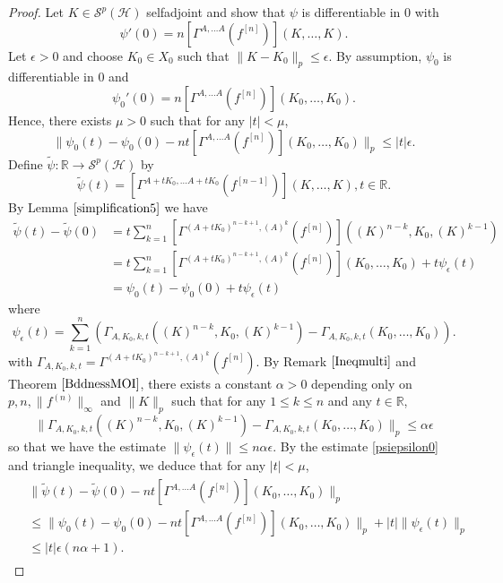 \documentclass[12pt]{amsart}
\theoremstyle{remark}
\begin{document}
\begin{proof}
Let $K\in \mathcal{S}^p(\mathcal{H})$ selfadjoint and show that $\psi$ is differentiable in $0$ with
$$
\psi'(0) = n \left[\Gamma^{A, \ldots A}(f^{[n]}) \right](K, \ldots, K).
$$
Let $\epsilon > 0$ and choose $K_0 \in X_0$ such that $\|K-K_0\|_p \leq \epsilon$. By assumption, $\psi_0$ is differentiable in $0$ and
$$
\psi_0'(0) = n \left[\Gamma^{A, \ldots A}(f^{[n]}) \right](K_0, \ldots, K_0).
$$
Hence, there exists $\mu > 0$ such that for any $|t| < \mu$,
\begin{equation}\label{psiepsilon0}
\|\psi_0(t) - \psi_0(0) - n t \left[\Gamma^{A, \ldots A}(f^{[n]}) \right](K_0, \ldots, K_0) \|_p \leq |t| \epsilon.
\end{equation}
Define $\tilde{\psi} : \mathbb{R} \to \mathcal{S}^p(\mathcal{H})$ by
$$
\tilde{\psi}(t) = \left[\Gamma^{A+tK_0, \ldots A+tK_0}(f^{[n-1]}) \right](K, \ldots, K), t\in \mathbb{R}.
$$
By Lemma $\ref{simplification5}$ we have
\begin{align*}
\tilde{\psi}(t) - \tilde{\psi}(0)
& = t \sum_{k=1}^n \left[ \Gamma^{(A+tK_0)^{n-k+1},(A)^k}(f^{[n]}) \right]((K)^{n-k}, K_0, (K)^{k-1}) \\
& = t \sum_{k=1}^n \left[ \Gamma^{(A+tK_0)^{n-k+1},(A)^k}(f^{[n]}) \right](K_0, \ldots, K_0) + t\psi_{\epsilon}(t) \\
& = \psi_0(t) - \psi_0(0) + t\psi_{\epsilon}(t)
\end{align*}
where
$$
\psi_{\epsilon}(t) = \sum_{k=1}^n \left( \Gamma_{A,K_0,k,t}((K)^{n-k}, K_0, (K)^{k-1}) - \Gamma_{A,K_0,k,t}(K_0,\ldots,K_0) \right).
$$
with $\Gamma_{A,K_0,k,t} = \Gamma^{(A+tK_0)^{n-k+1},(A)^k}(f^{[n]})$.
By Remark $\ref{Ineqmulti}$ and Theorem $\ref{BddnessMOI}$, there exists a constant $\alpha > 0$ depending only on $p, n, \|f^{(n)}\|_{\infty}$ and $\|K\|_p$ such that for any $1 \leq k \leq n$ and any $t\in \mathbb{R}$, 
$$
\| \Gamma_{A,K_0,k,t}((K)^{n-k}, K_0, (K)^{k-1}) - \Gamma_{A,K_0,k,t}(K_0, \ldots, K_0) \|_p \leq \alpha \epsilon
$$
so that we have the estimate $\| \psi_{\epsilon}(t) \| \leq n \alpha \epsilon.$ By the estimate \eqref{psiepsilon0} and triangle inequality, we deduce that for any $|t| < \mu$,
\begin{align}\label{psiepsilon4}
\begin{split}
& \| \tilde{\psi}(t) - \tilde{\psi}(0) - n t \left[\Gamma^{A, \ldots A}(f^{[n]}) \right](K_0, \ldots, K_0) \|_p \\
& \leq \| \psi_0(t) - \psi_0(0)  - n t \left[\Gamma^{A, \ldots A}(f^{[n]}) \right](K_0, \ldots, K_0) \|_p + |t| \| \psi_{\epsilon}(t) \|_p \\
& \leq |t| \epsilon (n\alpha + 1).
\end{split}
\end{align}


\end{proof}
\end{document}
